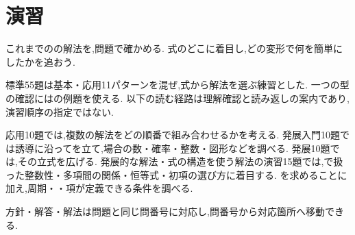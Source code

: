 
\section{演習}\label{節：演習}
これまでのの解法を,問題で確かめる.
式のどこに着目し,どの変形で何を簡単にしたかを追おう.
\par\smallskip
標準55題は基本・応用11パターンを混ぜ,式から解法を選ぶ練習とした.
一つの型の確認にはの例題を使える.
以下の読む経路は理解確認と読み返しの案内であり,演習順序の指定ではない.
\par\smallskip
応用10題では,複数の解法をどの順番で組み合わせるかを考える.
発展入門10題では誘導に沿ってを立て,場合の数・確率・整数・図形などを調べる.
発展10題では,その立式を広げる.
発展的な解法・式の構造を使う解法の演習15題では,で扱った整数性・多項間の関係・恒等式・初項の選び方に着目する.
を求めることに加え,周期・・項が定義できる条件を調べる.
\par\smallskip
方針・解答・解法は問題と同じ問番号に対応し,問番号から対応箇所へ移動できる.








